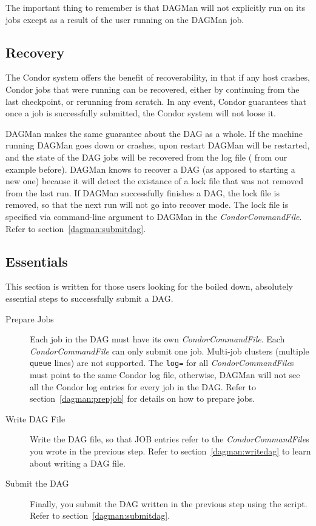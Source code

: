 The important thing to remember is that DAGMan will not explicitly run
 on its jobs except as a result of the user running  on
the DAGMan job.

\subsection{Recovery}

The Condor system offers the benefit of recoverability, in that if any host
crashes, Condor jobs that were running can be recovered, either by continuing
from the last checkpoint, or rerunning from scratch.  In any event, Condor
guarantees that once a job is successfully submitted, the Condor system will
not loose it.

DAGMan makes the same guarantee about the DAG as a whole.  If the machine
running DAGMan goes down or crashes, upon restart DAGMan will be restarted,
and the state of the DAG jobs will be recovered from the log file
( from our example before).  DAGMan knows to
recover a DAG (as apposed to starting a new one) because it will detect the
existance of a lock file that was not removed from the last run.  If DAGMan
successfully finishes a DAG, the lock file is removed, so that the next run
will not go into recover mode.  The lock file is specified via command-line
argument to DAGMan in the \textit{CondorCommandFile}.  Refer to
section~\ref{dagman:submitdag}.

\subsection{Essentials}
\label{dagman:essentials}

This section is written for those users looking for the boiled down,
absolutely essential steps to successfully submit a DAG.

\begin{description}

\item[Prepare Jobs] Each job in the DAG must have its own
\textit{CondorCommandFile}.  Each \textit{CondorCommandFile} can only submit
one job.  Multi-job clusters (multiple \texttt{queue} lines) are not
supported.  The \texttt{log=} for all \textit{CondorCommandFile}s must point
to the same Condor log file, otherwise, DAGMan will not see all the Condor log
entries for every job in the DAG.  Refer to section~\ref{dagman:prepjob} for
details on how to prepare jobs.

\item[Write DAG File] Write the DAG file, so that JOB entries refer to the
\textit{CondorCommandFile}s you wrote in the previous step.  Refer to
section~\ref{dagman:writedag} to learn about writing a DAG file.

\item[Submit the DAG] Finally, you submit the DAG written in the previous step
using the  script.  Refer to
section~\ref{dagman:submitdag}.

\end{description}



